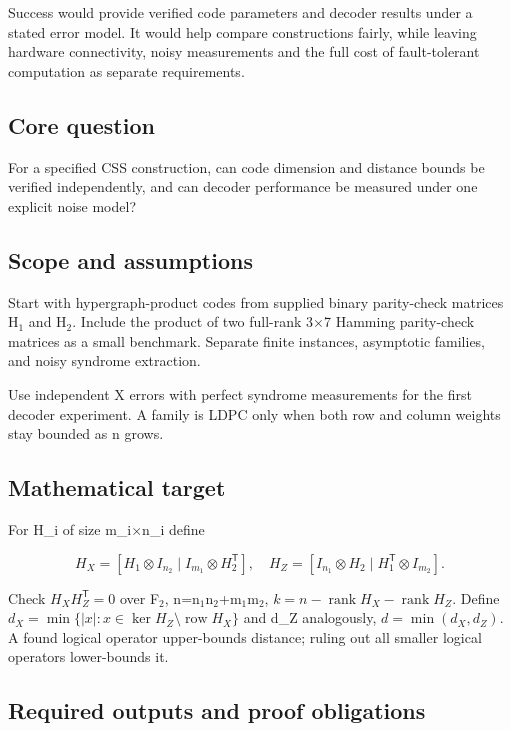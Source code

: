 \documentclass[
  11pt,
]{article}
\begin{document}
Success would provide verified code parameters and decoder results under
a stated error model. It would help compare constructions fairly, while
leaving hardware connectivity, noisy measurements and the full cost of
fault-tolerant computation as separate requirements.

\subsection{Core question}

For a specified CSS construction, can code dimension and distance bounds
be verified independently, and can decoder performance be measured under
one explicit noise model?

\subsection{Scope and assumptions}

Start with hypergraph-product codes from supplied binary parity-check
matrices H\ensuremath{{}_{1}} and H\ensuremath{{}_{2}}. Include the
product of two full-rank 3\ensuremath{\times}7 Hamming parity-check
matrices as a small benchmark. Separate finite instances, asymptotic
families, and noisy syndrome extraction.

Use independent X errors with perfect syndrome measurements for the
first decoder experiment. A family is LDPC only when both row and column
weights stay bounded as n grows.

\subsection{Mathematical target}

For H\_i of size m\_i\ensuremath{\times}n\_i define

\[H_X=[H_1\otimes I_{n_2}\mid I_{m_1}\otimes H_2^{\mathsf T}],\quad H_Z=[I_{n_1}\otimes H_2\mid H_1^{\mathsf T}\otimes I_{m_2}].\]

Check \(H_XH_Z^{\mathsf T}=0\) over F\ensuremath{{}_{2}},
n=n\ensuremath{{}_{1}}n\ensuremath{{}_{2}}+m\ensuremath{{}_{1}}m\ensuremath{{}_{2}},
\(k=n-\operatorname{rank}H_X-\operatorname{rank}H_Z\). Define
\(d_X=\min\{|x|:x\in\ker H_Z\setminus\operatorname{row}H_X\}\) and d\_Z
analogously, \(d=\min(d_X,d_Z)\). A found logical operator upper-bounds
distance; ruling out all smaller logical operators lower-bounds it.

\subsection{Required outputs and proof obligations}
\end{document}
